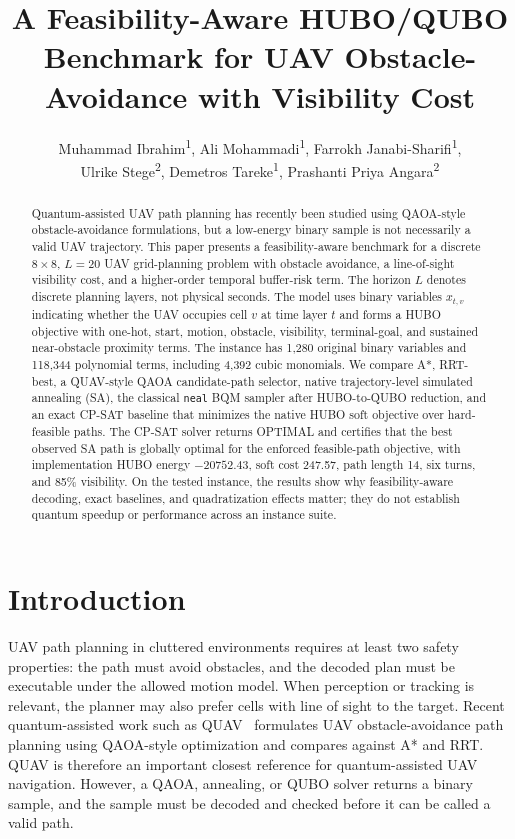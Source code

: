 \documentclass[letterpaper]{article} %
\title{A Feasibility-Aware HUBO/QUBO Benchmark for UAV Obstacle-Avoidance with Visibility Cost}
\author{
Muhammad Ibrahim\textsuperscript{\rm 1},
Ali Mohammadi\textsuperscript{\rm 1},
Farrokh Janabi-Sharifi\textsuperscript{\rm 1},\\
Ulrike Stege\textsuperscript{\rm 2},
Demetros Tareke\textsuperscript{\rm 1},
Prashanti Priya Angara\textsuperscript{\rm 2}
}
\begin{document}
\maketitle

\begin{abstract}
Quantum-assisted UAV path planning has recently been studied using QAOA-style obstacle-avoidance formulations, but a low-energy binary sample is not necessarily a valid UAV trajectory. This paper presents a feasibility-aware benchmark for a discrete $8\times8$, $L=20$ UAV grid-planning problem with obstacle avoidance, a line-of-sight visibility cost, and a higher-order temporal buffer-risk term. The horizon $L$ denotes discrete planning layers, not physical seconds. The model uses binary variables $x_{t,v}$ indicating whether the UAV occupies cell $v$ at time layer $t$ and forms a HUBO objective with one-hot, start, motion, obstacle, visibility, terminal-goal, and sustained near-obstacle proximity terms. The instance has 1,280 original binary variables and 118,344 polynomial terms, including 4,392 cubic monomials. We compare A*, RRT-best, a QUAV-style QAOA candidate-path selector, native trajectory-level simulated annealing (SA), the classical \texttt{neal} BQM sampler after HUBO-to-QUBO reduction, and an exact CP-SAT baseline that minimizes the native HUBO soft objective over hard-feasible paths. The CP-SAT solver returns OPTIMAL and certifies that the best observed SA path is globally optimal for the enforced feasible-path objective, with implementation HUBO energy $-20752.43$, soft cost 247.57, path length 14, six turns, and 85\% visibility. On the tested instance, the results show why feasibility-aware decoding, exact baselines, and quadratization effects matter; they do not establish quantum speedup or performance across an instance suite.
\end{abstract}

\begin{links}
\end{links}


\section{Introduction}
UAV path planning in cluttered environments requires at least two safety properties: the path must avoid obstacles, and the decoded plan must be executable under the allowed motion model. When perception or tracking is relevant, the planner may also prefer cells with line of sight to the target. Recent quantum-assisted work such as QUAV~\cite{innan2025quav} formulates UAV obstacle-avoidance path planning using QAOA-style optimization and compares against A* and RRT. QUAV is therefore an important closest reference for quantum-assisted UAV navigation. However, a QAOA, annealing, or QUBO solver returns a binary sample, and the sample must be decoded and checked before it can be called a valid path.
\end{document}
